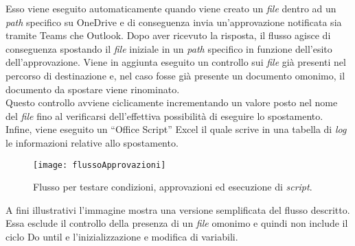 Esso viene eseguito automaticamente quando viene creato un \emph{file} dentro ad un \emph{path} specifico su OneDrive e di conseguenza invia un'approvazione notificata sia tramite Teams che Outlook.
Dopo aver ricevuto la risposta, il flusso agisce di conseguenza spostando il \emph{file} iniziale in un \emph{path} specifico in funzione dell'esito dell'approvazione.
Viene in aggiunta eseguito un controllo sui \emph{file} già presenti nel percorso di destinazione e, nel caso fosse già presente un documento omonimo, il documento da spostare viene rinominato.\\
Questo controllo avviene ciclicamente incrementando un valore posto nel nome del \emph{file} fino al verificarsi dell'effettiva possibilità di eseguire lo spostamento.\\
Infine, viene eseguito un “Office Script” Excel il quale scrive in una tabella di \emph{log} le informazioni relative allo spostamento.
\begin{figure}[htbp] 
    \centering 
    \texttt{[image: flussoApprovazioni]} 
    \caption{Flusso per testare condizioni, approvazioni ed esecuzione di \emph{script}.}
    \label{fig:flussoApprovazioni}
\end{figure}
\newline \noindent A fini illustrativi l'immagine mostra una versione semplificata del flusso descritto.
Essa esclude il controllo della presenza di un \emph{file} omonimo e quindi non include il ciclo Do until e l'inizializzazione e modifica di variabili.\\


